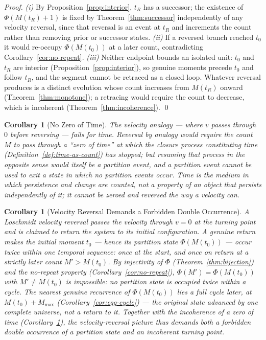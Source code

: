 \documentclass[twocolumn,10pt,a4paper]{article}
\theoremstyle{thmstyle}
\newtheorem{corollary}[theorem]{Corollary}
\theoremstyle{definition}
\theoremstyle{remark}
\newcommand{\Mmax}{M_{\max}}
\newcommand{\PhiMap}{\varPhi}
\begin{document}
\begin{proof}
\textit{(i)} By Proposition~\ref{prop:interior}, $t_R$ has a successor; the
existence of $\PhiMap(M(t_R)+1)$ is fixed by Theorem~\ref{thm:successor}
independently of any velocity reversal, since that reversal is an event at
$t_R$ and increments the count rather than removing prior or successor states.
\textit{(ii)} If a reversed branch reached $t_0$ it would re-occupy
$\PhiMap(M(t_0))$ at a later count, contradicting Corollary~\ref{cor:no-repeat}.
\textit{(iii)} Neither endpoint bounds an isolated unit: $t_0$ and $t_R$ are
interior (Proposition~\ref{prop:interior}), so genuine moments precede $t_0$ and
follow $t_R$, and the segment cannot be retraced as a closed loop. Whatever
reversal produces is a distinct evolution whose count increases from $M(t_R)$
onward (Theorem~\ref{thm:monotone}); a retracing would require the count to
decrease, which is incoherent (Theorem~\ref{thm:incoherence}). \qed
\end{proof}

\begin{corollary}[No Zero of Time]
\label{cor:zero-time}
The velocity analogy --- where $v$ passes through $0$ before reversing ---
fails for time. Reversal by analogy would require the count $M$ to pass through
a ``zero of time'' at which the closure process constituting time
(Definition~\ref{def:time-as-count}) has stopped; but resuming that process in
the opposite sense would itself be a partition event, and a partition event
cannot be used to exit a state in which no partition events occur. Time is the
medium in which persistence and change are counted, not a property of an object
that persists independently of it; it cannot be zeroed and reversed the way a
velocity can.
\end{corollary}

\begin{corollary}[Velocity Reversal Demands a Forbidden Double Occurrence]
\label{cor:double-occurrence}
A Loschmidt velocity reversal passes the velocity through $v = 0$ at the turning
point and is claimed to return the system to its initial configuration. A genuine
return makes the initial moment $t_0$ --- hence its partition state
$\PhiMap(M(t_0))$ --- occur \emph{twice} within one temporal sequence: once at
the start, and once on return at a strictly later count $M' > M(t_0)$. By
injectivity of $\PhiMap$ (Theorem~\ref{thm:bijection}) and the no-repeat property
(Corollary~\ref{cor:no-repeat}), $\PhiMap(M') = \PhiMap(M(t_0))$ with $M' \neq
M(t_0)$ is impossible: no partition state is occupied twice within a cycle. The
nearest genuine recurrence of $\PhiMap(M(t_0))$ lies a full cycle later, at
$M(t_0) + \Mmax$ (Corollary~\ref{cor:egg-cycle}) --- the original state advanced
by one complete universe, not a return to it. Together with the incoherence of a
zero of time (Corollary~\ref{cor:zero-time}), the velocity-reversal picture thus
demands both a forbidden double occurrence of a partition state and an incoherent
turning point.
\end{corollary}
\end{document}
